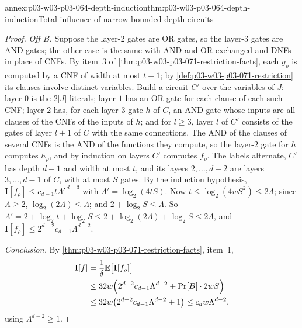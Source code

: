 \begin{annexitem}{annex:p03-w03-p03-064-depth-induction}{thm:p03-w03-p03-064-depth-induction}{Total influence of narrow bounded-depth circuits}
\begin{proof}
\emph{Off \(B\).}  Suppose the layer-\(2\) gates are OR gates, so the
layer-\(3\) gates are AND gates; the other case is the same with AND and OR
exchanged and DNFs in place of CNFs.  By item~3 of
\cref{thm:p03-w03-p03-071-restriction-facts}, each \(g_\rho\) is computed by
a CNF of width at most \(t-1\); by \cref{def:p03-w03-p03-071-restriction}
its clauses involve distinct variables.  Build a
circuit \(C'\) over the variables of \(J\): layer \(0\) is the \(2|J|\)
literals; layer \(1\) has an OR gate for each clause of each such CNF; layer
\(2\) has, for each layer-\(3\) gate \(h\) of \(C\), an AND gate whose
inputs are all clauses of the CNFs of the inputs of \(h\); and for
\(l\geq3\), layer \(l\) of \(C'\) consists of the gates of layer \(l+1\) of
\(C\) with the same connections.  The AND of the clauses of several CNFs is
the AND of the functions they compute, so the layer-\(2\) gate for \(h\)
computes \(h_\rho\), and by induction on layers \(C'\) computes \(f_\rho\).
The labels alternate, \(C'\) has depth \(d-1\) and width at most \(t\), and
its layers \(2,\ldots,d-2\) are layers \(3,\ldots,d-1\) of \(C\), with at
most \(S\) gates.  By the induction hypothesis,
\(\mathbf I[f_\rho]\leq c_{d-1}t\Lambda'^{\,d-3}\) with
\(\Lambda'=\log_2(4tS)\).  Now \(t\leq\log_2(4wS^2)\leq2\Lambda\); since
\(\Lambda\geq2\), \(\log_2(2\Lambda)\leq\Lambda\); and
\(2+\log_2S\leq\Lambda\).  So
\(\Lambda'=2+\log_2t+\log_2S\leq2+\log_2(2\Lambda)+\log_2S\leq2\Lambda\),
and \(\mathbf I[f_\rho]\leq2^{d-2}c_{d-1}\Lambda^{d-2}\).

\emph{Conclusion.}  By \cref{thm:p03-w03-p03-071-restriction-facts}, item~1,
\begin{align*}
  \mathbf I[f]&=\frac1\delta\mathbb E\bigl[\mathbf I[f_\rho]\bigr]\\
  &\leq32w\Bigl(2^{d-2}c_{d-1}\Lambda^{d-2}+\Pr[B]\cdot2wS\Bigr)\\
  &\leq32w\bigl(2^{d-2}c_{d-1}\Lambda^{d-2}+1\bigr)
   \leq c_dw\Lambda^{d-2},
\end{align*}
using \(\Lambda^{d-2}\geq1\).
\end{proof}
\end{annexitem}

